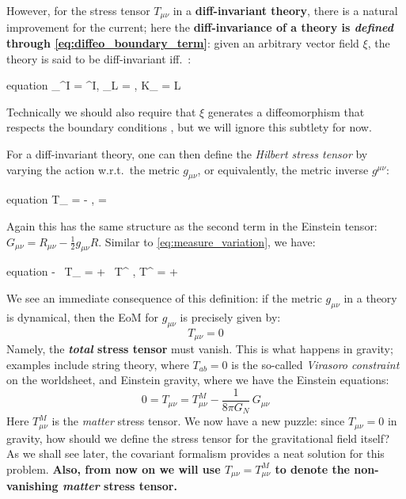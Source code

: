 \documentclass[a4paper
	,10pt
]{article}
\begin{document}
	However, for the stress tensor $T_{\mu\nu}$ in a \textbf{diff-invariant theory}, there is a natural improvement for the current; here the \textbf{diff-invariance of a theory is \textit{defined} through \eqref{eq:diffeo_boundary_term}}: given an arbitrary vector field $\xi$, the theory is said to be diff-invariant iff.~\cite{Harlow:2019yfa,Compere:2018aar}:
	\begin{empheq}{equation}
		\var_\xi \phi^I
		= \ldv{\xi} \phi^I,
	\quad
		\var_\xi L
		= ,
	\quad
		K_\xi
		= \xi \cdot L
	\end{empheq}
	Technically we should also require that $\xi$ generates a diffeomorphism that respects the boundary conditions \cite{Harlow:2019yfa}, but we will ignore this subtlety for now. 
	
	For a diff-invariant theory, one can then define the \textit{Hilbert stress tensor} by varying the action w.r.t.~the metric $g_{\mu\nu}$, or equivalently, the metric inverse $g^{\mu\nu}$:
	\begin{empheq}{equation}
		T_{\mu\nu}
		= - 
			,
	\quad
		= \int {}  
	\end{empheq}
	Again this has the same structure as the second term in the Einstein tensor: $
		G_{\mu\nu}
		= R_{\mu\nu} - \frac{1}{2} g_{\mu\nu} R
	$. 
	Similar to \eqref{eq:measure_variation}, we have:
	\begin{empheq}{equation}
		- \, T_{\mu\nu}
		= + \, T^{\mu\nu}
			,
	\quad
		T^{\mu\nu}
		= + 
	\end{empheq}
	
	We see an immediate consequence of this definition: if the metric $g_{\mu\nu}$ in a theory is dynamical, then the EoM for $g_{\mu\nu}$ is precisely given by:
	\begin{equation}
		T_{\mu\nu} = 0
	\end{equation}
	Namely, the \textbf{\textit{total} stress tensor} must vanish. This is what happens in gravity; examples include string theory, where $T_{ab} = 0$ is the so-called \textit{Virasoro constraint} on the worldsheet, and Einstein gravity, where we have the Einstein equations:
	\begin{equation}
		0 = T_{\mu\nu}
		= T^M_{\mu\nu}
			- \frac{1}{8\pi G_N}\,G_{\mu\nu}
	\end{equation}
	Here $T^M_{\mu\nu}$ is the \textit{matter} stress tensor. We now have a new puzzle: since $T_{\mu\nu} = 0$ in gravity, how should we define the stress tensor for the gravitational field itself? As we shall see later, the covariant formalism provides a neat solution for this problem. \textbf{Also, from now on we will use $T_{\mu\nu} = T^M_{\mu\nu}$ to denote the non-vanishing \textit{matter} stress tensor.} 
	
\end{document}
